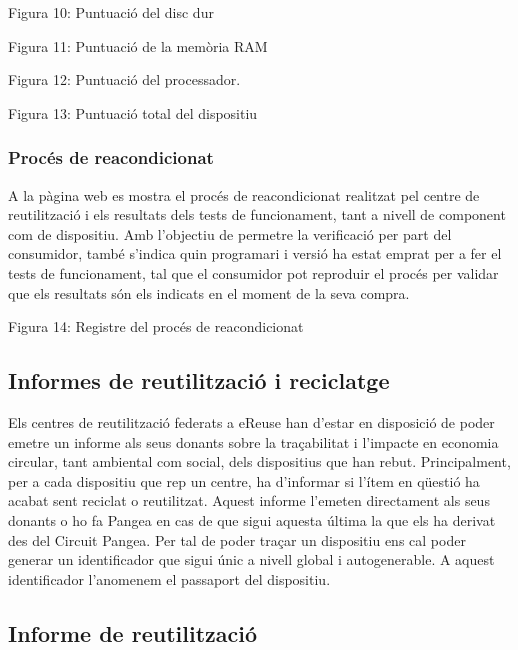\documentclass[
]{book}
\begin{document}
Figura 10: Puntuació del disc dur

Figura 11: Puntuació de la memòria RAM

Figura 12: Puntuació del processador.

Figura 13: Puntuació total del dispositiu

\hypertarget{procuxe9s-de-reacondicionat}{%
\subsubsection{Procés de reacondicionat}\label{procuxe9s-de-reacondicionat}}

A la pàgina web es mostra el procés de reacondicionat realitzat pel centre de reutilització i els resultats dels tests de funcionament, tant a nivell de component com de dispositiu. Amb l'objectiu de permetre la verificació per part del consumidor, també s'indica quin programari i versió ha estat emprat per a fer el tests de funcionament, tal que el consumidor pot reproduir el procés per validar que els resultats són els indicats en el moment de la seva compra.

Figura 14: Registre del procés de reacondicionat

\hypertarget{informes-de-reutilitzaciuxf3-i-reciclatge}{%
\subsection{Informes de reutilització i reciclatge}\label{informes-de-reutilitzaciuxf3-i-reciclatge}}

Els centres de reutilització federats a eReuse han d'estar en disposició de poder emetre un informe als seus donants sobre la traçabilitat i l'impacte en economia circular, tant ambiental com social, dels dispositius que han rebut. Principalment, per a cada dispositiu que rep un centre, ha d'informar si l'ítem en qüestió ha acabat sent reciclat o reutilitzat. Aquest informe l'emeten directament als seus donants o ho fa Pangea en cas de que sigui aquesta última la que els ha derivat des del Circuit Pangea. Per tal de poder traçar un dispositiu ens cal poder generar un identificador que sigui únic a nivell global i autogenerable. A aquest identificador l'anomenem el passaport del dispositiu.

\hypertarget{informe-de-reutilitzaciuxf3}{%
\subsection{Informe de reutilització}\label{informe-de-reutilitzaciuxf3}}
\end{document}
